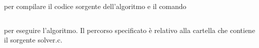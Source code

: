 \noindent
per compilare il codice sorgente dell'algoritmo e il comando
\begin{inline}
\begin{lstlisting}[style=style2]
%\scalebox{0.7}{\faDollarSign}% ./solver <path/to/csr_matrix.dat> <K>
\end{lstlisting}
\end{inline}
\noindent
per eseguire l'algoritmo.
Il percorso specificato è relativo alla cartella che contiene il sorgente {\jbm solver.c}.
